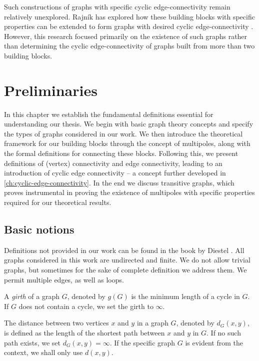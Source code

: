 \documentclass[12pt, twoside]{book}
\begin{document}
Such constructions of graphs with specific cyclic edge-connectivity remain relatively unexplored. Rajník has explored how these building blocks with specific properties can be extended to form graphs with desired cyclic edge-connectivity \cite{Rajnik_phd}. However, this research focused primarily on the existence of such graphs rather than determining the cyclic edge-connectivity of graphs built from more than two building blocks.

\todo{}

\chapter{Preliminaries}\label{ch:preliminaries}

In this chapter we establish the fundamental definitions essential for understanding our thesis. We begin with basic graph theory concepts and specify the types of graphs considered in our work. We then introduce the theoretical framework for our building blocks through the concept of multipoles, along with the formal definitions for connecting these blocks. Following this, we present definitions of (vertex) connectivity and edge connectivity, leading to an introduction of cyclic edge connectivity -- a concept further developed in \cref{ch:cyclic-edge-connectivity}. In the end we discuss transitive graphs, which proves instrumental in proving the existence of multipoles with specific properties required for our theoretical results.

\section{Basic notions}

Definitions not provided in our work can be found in the book  by Diestel \cite{Diestel}. All graphs considered in this work are undirected and finite. We do not allow trivial graphs, but sometimes for the sake of complete definition we address them. We permit multiple edges, as well as loops.

A \textit{girth} of a graph $G$, denoted by $g(G)$ is the minimum length of a cycle in $G$. If $G$ does not contain a cycle, we set the girth to $\infty$.

The distance between two vertices $x$ and $y$ in a graph $G$, denoted by $d_G(x,y)$, is defined as the length of the shortest path between $x$ and $y$ in $G$. If no such path exists, we set $d_G(x,y)=\infty$. If the specific graph $G$ is evident from the context, we shall only use $d(x,y)$.
\end{document}
